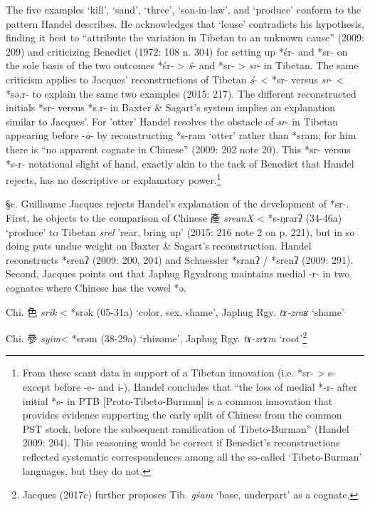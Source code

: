 The five examples `kill', `sand', `three', `son-in-law', and `produce'
conform to the pattern Handel describes. He acknowledges that `louse'
con­tra­dicts his hypothesis, finding it best to ``attribute the
variation in Tibetan to an unknown cause'' (2009: 209) and criticizing
Benedict (1972: 108 n. 304) for setting up *śr- and *sr- on the sole
basis of the two outcomes *śr- \textgreater{} \emph{ś}- and *sr-
\textgreater{} \emph{sr}- in Tibetan. The same criticism applies to
Jacques' reconstructions of Tibetan \emph{ś}- \textless{} *sr- versus
 \emph{sr}- \textless{} *sə.r- to explain the same two examples (2015:
217). The different re­con­structed initials *sr- versus *s.r- in Baxter
\& Sagart's system implies an explanation similar to Jacques'. For
'otter' Handel resolves the obstacle of \emph{sr}- in Tibetan appearing
before -\emph{a}- by reconstructing *s-ram `otter' rather than *sram;
for him there is ``no apparent cognate in Chinese'' (2009: 202 note 20).
This *sr- versus *s-r- notational slight of hand, exactly akin to the
tack of Benedict that Handel rejects, has no descriptive or explanatory
power.\footnote{From these scant data in support of a Tibetan innovation
  (i.e. *sr- \textgreater{} s- except before -e- and i-), Handel
  concludes that ``the loss of medial *-r- after initial *s- in PTB
  {[}Proto-Tibeto-Burman] is a common innovation that provides
  evidence supporting the early split of Chinese from the common PST
  stock, before the subsequent ramification of Tibeto-Burman'' (Handel
  2009: 204). This reasoning would be correct if Benedict's
  reconstructions reflected systematic correspondences among all the
  so-called `Tibeto-Burman' languages, but they do not.}

§c. Guillaume Jacques rejects Handel's explanation of the development of
*sr-. First, he objects to the comparison of Chinese 產  \emph{sreanX}
\textless{} *s-ŋrarʔ (34-46a) `produce' to Tibetan 
{} \emph{srel}
'rear, bring up' (2015: 216 note 2 on p. 221), but in so doing puts
undue weight on Baxter \& Sagart's reconstruction. Handel reconstructs
*s{}renʔ (2009: 200, 204) and Schuessler *s{}ranʔ / *s{}renʔ (2009: 291).
Second, Jacques points out that Japhug Rgyalrong maintains medial -r- in
two cognates where Chinese has the vowel *ə.

\begin{description} \item
Chi. 色  \emph{srik} \textless{} *srək (05-31a) `color, sex, shame',
Japhug Rgy. \emph{tɤ‑zraʁ} `shame'

\item
Chi. 參 \emph{syim}\textless{} *srəm (38-29a) `rhizome', Japhug Rgy.
 \emph{tɤ-zrɤm} `root'\footnote{Jacques (2017c) further proposes Tib. {} \emph{gśam} `base, underpart' as a cognate. }
\end{description}

